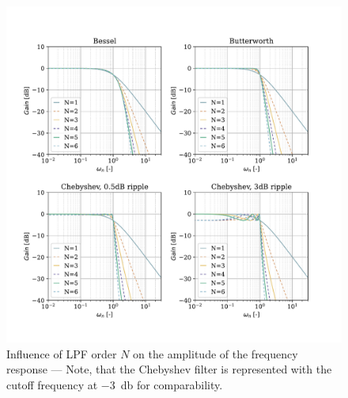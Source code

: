 \begin{figure}[!htb]
  \centering
  \includegraphics[scale=0.72]{figures/electronics/lowpass/lp_filter_mag}
  \caption[Influence of \ac{LPF} order $N$ on the amplitude of the frequency response]{Influence of \ac{LPF} order $N$ on the amplitude of the frequency response --- Note, that the Chebyshev filter is represented with the cutoff frequency at \SI{-3}{\decibel} for comparability.%
    \label{fig:lp_filter_mag}}
\end{figure}

